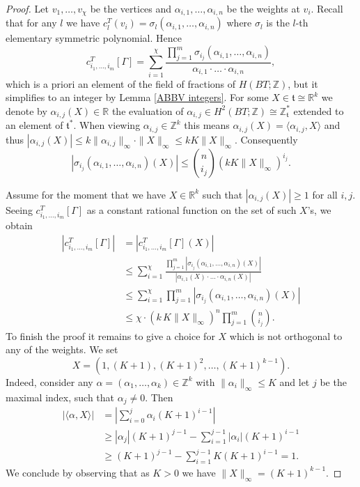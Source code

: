 \documentclass[12pt,a4paper]{amsart}
\newcommand{\mft}{\mathfrak{t}}
\newcommand{\RR}{\mathbb{R}}
\newcommand{\ZZ}{\mathbb{Z}}
\theoremstyle{plain}
\theoremstyle{definition}
\begin{document}
\begin{proof}
Let $v_1,\ldots, v_\chi$ be the vertices and $\alpha_{i,1},\ldots,\alpha_{i,n}$ be the weights at $v_i$. Recall that for any $l$ we have $c_l^T(v_i)=\sigma_{l}(\alpha_{i,1},\ldots,\alpha_{i,n})$ where $\sigma_l$ is the $l$-th elementary symmetric polynomial. Hence
\[c^T_{i_1,\ldots,i_m}[\Gamma] = \sum_{i=1}^{\chi} \frac{\prod_{j=1}^m \sigma_{i_j}(\alpha_{i,1},\ldots,\alpha_{i,n})}{\alpha_{i,1}\cdot\ldots\cdot\alpha_{i,n}},\]
which is a priori an element of the field of fractions of $H(BT;\ZZ)$, but it simplifies to an integer by Lemma \ref{ABBV integers}. For some $X\in \mathfrak{t}\cong \RR^k$ we denote by $\alpha_{i,j}(X)\in \RR$ the evaluation of $\alpha_{i,j}\in H^2(BT;\ZZ)\cong \ZZ_\mft^*$ extended to an element of $\mft^*$. When viewing $\alpha_{i,j}\in \ZZ^k$ this means $\alpha_{i,j}(X)=\langle \alpha_{i,j},X\rangle$ and thus $|\alpha_{i,j}(X)|\leq k \|\alpha_{i,j}\|_\infty \cdot \|X\|_\infty\leq kK\|X\|_\infty$. Consequently
\[|\sigma_{i_j}(\alpha_{i,1},\ldots,\alpha_{i,n})(X)|\leq {n \choose i_j}(kK\|X\|_\infty)^{i_j}.
\]

Assume for the moment that we have $X\in \RR^k$ such that $|\alpha_{i,j}(X)|\geq 1$ for all $i,j$. Seeing $c^T_{i_1,\ldots,i_m}[\Gamma]$ as a constant rational function on the set of such $X$'s, we obtain
\begin{align*}
|c^T_{i_1,\ldots,i_m}[\Gamma]| &= \left|c^T_{i_1,\ldots,i_m}[\Gamma] (X)\right|\\
&\leq \sum_{i=1}^\chi \frac{\prod_{j=1}^m |\sigma_{i_j}(\alpha_{i,1},\ldots,\alpha_{i,n})(X)|}{|\alpha_{i,1}(X)\cdot\ldots\cdot\alpha_{i,n}(X)|}\\
&\leq \sum_{i=1}^\chi \prod_{j=1}^m |\sigma_{i_j}(\alpha_{i,1},\ldots,\alpha_{i,n})(X)|\\
&\leq \chi\cdot (k\,K\|X\|_\infty)^n\prod_{j=1}^m {n\choose i_j}.
\end{align*}
To finish the proof it remains to give a choice for $X$ which is not orthogonal to any of the weights. We set
\[X= (1,(K+1),(K+1)^2,\ldots, (K+1)^{k-1}).\]
Indeed, consider any $\alpha =(\alpha_1,\ldots,\alpha_k)\in \ZZ^k$ with $\|\alpha_i\|_{\infty}\leq K$ and let $j$ be the maximal index, such that $\alpha_j\neq 0$. Then
\begin{align*}
|\langle\alpha,X\rangle| &=\left|\sum_{i=0}^j \alpha_i (K+1)^{i-1}\right|\\ &\geq |\alpha_j| (K+1)^{j-1}-\sum_{i=1}^{j-1} |\alpha_i|(K+1)^{i-1}\\ &\geq (K+1)^{j-1} - \sum^{j-1}_{i=1} K(K+1)^{i-1} =1.
\end{align*}
We conclude by observing that as $K> 0$ we have $\|X\|_\infty = (K+1)^{k-1}$.
\end{proof}
\end{document}
